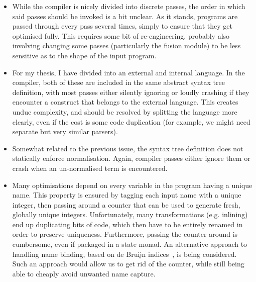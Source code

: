 \begin{itemize}
\item While the compiler is nicely divided into discrete passes, the
  order in which said passes should be invoked is a bit unclear.  As
  it stands, programs are passed through every pass several times,
  simply to ensure that they get optimised fully.  This requires some
  bit of re-engineering, probably also involving changing some passes
  (particularly the fusion module) to be less sensitive as to the
  shape of the input program.

\item For my thesis, I have divided \LO{} into an external and
  internal language.  In the compiler, both of these are included in
  the same abstract syntax tree definition, with most passes either
  silently ignoring or loudly crashing if they encounter a construct
  that belongs to the external language.  This creates undue
  complexity, and should be resolved by splitting the language more
  clearly, even if the cost is some code duplication (for example, we
  might need separate but very similar parsers).

\item Somewhat related to the previous issue, the \LO{} syntax tree
  definition does not statically enforce normalisation.  Again,
  compiler passes either ignore them or crash when an un-normalised
  term is encountered.

\item Many optimisations depend on every variable in the program
  having a unique name.  This property is ensured by tagging each
  input name with a unique integer, then passing around a counter that
  can be used to generate fresh, globally unique integers.
  Unfortunately, many transformations (e.g. inlining) end up
  duplicating bits of code, which then have to be entirely renamed in
  order to preserve uniqueness.  Furthermore, passing the counter
  around is cumbersome, even if packaged in a state monad.  An
  alternative approach to handling name binding, based on de Bruijn
  indices~\cite{McBride:2004:FPI:1017472.1017477}, is being
  considered.  Such an approach would allow us to get rid of the
  counter, while still being able to cheaply avoid unwanted name
  capture.
\end{itemize}

